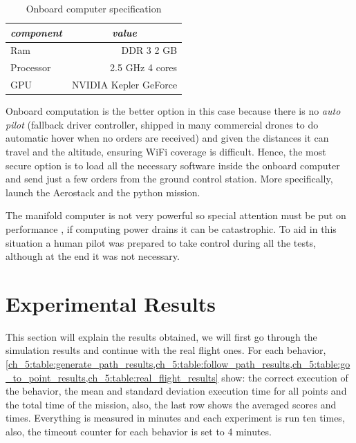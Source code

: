     \begin{table}[!h]
      \centering
      \begin{tabular}{lr} \toprule
        \multicolumn{1}{c}{\textit{component}} & \multicolumn{1}{c}{\textit{value}}   \\ \midrule
        Ram           & DDR 3 2 GB     \\
        Processor     & 2.5 GHz 4 cores \\
        GPU           & NVIDIA Kepler GeForce \\ \bottomrule
        \hline
      \end{tabular}
      \caption{Onboard computer specification}
      \label{ch_5:table:manifold_specs}
    \end{table}

    Onboard computation is the better option in this case because there is no \textit{auto pilot} (fallback driver controller, shipped in many commercial drones to do automatic hover when no orders are received) and given the distances it can travel and the altitude, ensuring WiFi coverage is difficult. Hence, the most secure option is to load all the necessary software inside the onboard computer and send just a few orders from the ground control station. More specifically, launch the Aerostack and the python mission.

    The manifold computer is not very powerful so special attention must be put on performance , if computing power drains it can be catastrophic. To aid in this situation a human pilot was prepared to take control during all the tests, although at the end it was not necessary.

\section{Experimental Results} \label{ch_5:sect:results}

  This section will explain the results obtained, we will first go through the simulation results and continue with the real flight ones. For each behavior, \cref{ch_5:table:generate_path_results,ch_5:table:follow_path_results,ch_5:table:go_to_point_results,ch_5:table:real_flight_results} show: the correct execution of the behavior, the mean and standard deviation execution time for all points and the total time of the mission, also, the last row shows the averaged scores and times. Everything is measured in minutes and each experiment is run ten times, also, the timeout counter for each behavior is set to 4 minutes.
 
